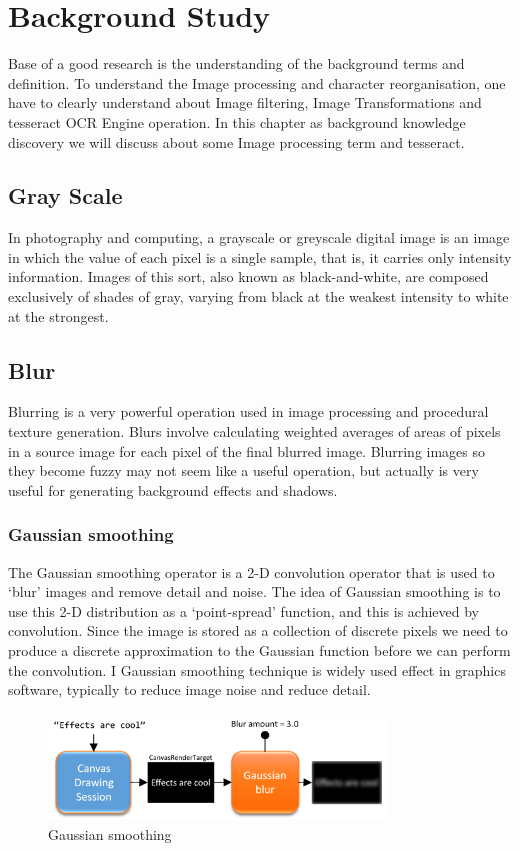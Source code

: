 \chapter {Background Study}
\label{background_study}
Base of a good research is the understanding of the background terms and definition. To understand the Image processing and character reorganisation, one have to clearly understand about Image filtering, Image Transformations and tesseract OCR Engine operation. In this chapter as background knowledge discovery we will discuss about some Image processing term and tesseract.

\section{Gray Scale}
In photography and computing, a grayscale or greyscale digital image is an image in which the value of each pixel is a single sample, that is, it carries only intensity information. Images of this sort, also known as black-and-white, are composed exclusively of shades of gray, varying from black at the weakest intensity to white at the strongest. \cite{GrayScale}

\section{Blur}
Blurring is a very powerful operation used in image processing and procedural texture generation. Blurs involve calculating weighted averages of areas of pixels in a source image for each pixel of the final blurred image. Blurring images so they become fuzzy may not seem like a useful operation, but actually is very useful for generating background effects and shadows.\cite{GaussianSmoothing}

\subsection{Gaussian smoothing}
The Gaussian smoothing operator is a 2-D convolution operator that is used to `blur' images and remove detail and noise. The idea of Gaussian smoothing is to use this 2-D distribution as a `point-spread' function, and this is achieved by convolution. Since the image is stored as a collection of discrete pixels we need to produce a discrete approximation to the Gaussian function before we can perform the convolution. I Gaussian smoothing technique is widely used effect in graphics software, typically to reduce image noise and reduce detail. \cite{GaussianSmoothing}
\begin{figure}[H]
\centering
\label{fig:Blur} 
\includegraphics[width=0.8\textwidth]{Blur.png}
\caption {Gaussian smoothing}
\end{figure}

